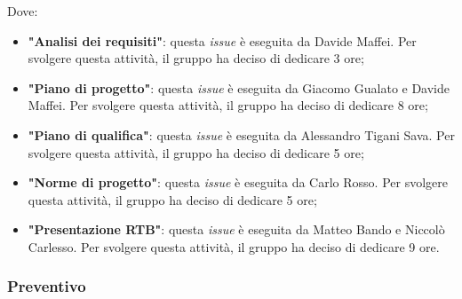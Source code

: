 Dove:
\begin{itemize}
	\item \textbf{"Analisi dei requisiti"}: questa \textit{issue} è eseguita da
	      Davide Maffei. Per
	      svolgere questa attività, il gruppo ha deciso di dedicare 3 ore;

	\item \textbf{"Piano di progetto"}: questa \textit{issue} è eseguita da
	      Giacomo Gualato e Davide Maffei. Per svolgere questa attività, il gruppo ha deciso
	      di dedicare 8 ore;

	\item \textbf{"Piano di qualifica"}: questa \textit{issue} è eseguita da
	      Alessandro Tigani Sava. Per svolgere questa attività, il gruppo ha
	      deciso di dedicare 5 ore;

	\item \textbf{"Norme di progetto"}: questa \textit{issue} è eseguita da Carlo Rosso.
	      Per svolgere questa attività, il gruppo ha deciso di
	      dedicare 5 ore;

	\item \textbf{"Presentazione RTB"}: questa \textit{issue} è eseguita
	      da Matteo Bando e Niccolò Carlesso. Per svolgere questa
	      attività, il gruppo ha deciso di dedicare 9 ore.
\end{itemize}

\subsubsection{Preventivo}

